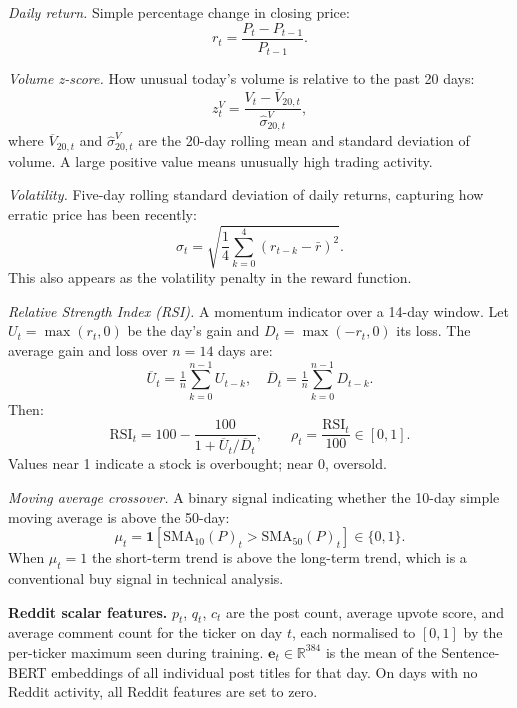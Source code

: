 \documentclass[letterpaper,twocolumn]{article}
\begin{document}
\noindent\textit{Daily return.}
Simple percentage change in closing price:
\begin{equation}
  r_t = \frac{P_t - P_{t-1}}{P_{t-1}}.
\end{equation}

\noindent\textit{Volume z-score.}
How unusual today's volume is relative to the past 20 days:
\begin{equation}
  z^V_t = \frac{V_t - \overline{V}_{20,t}}{\hat{\sigma}^V_{20,t}},
\end{equation}
where $\overline{V}_{20,t}$ and $\hat{\sigma}^V_{20,t}$ are
the 20-day rolling mean and standard deviation of volume.
A large positive value means unusually high trading activity.

\noindent\textit{Volatility.}
Five-day rolling standard deviation of daily returns,
capturing how erratic price has been recently:
\begin{equation}
  \sigma_t = \sqrt{\frac{1}{4}\sum_{k=0}^{4}(r_{t-k} - \bar{r})^2}.
\end{equation}
This also appears as the volatility penalty in the reward
function.

\noindent\textit{Relative Strength Index (RSI).}
A momentum indicator over a 14-day window.
Let $U_t = \max(r_t,0)$ be the day's gain and
$D_t = \max(-r_t,0)$ its loss.
The average gain and loss over $n=14$ days are:
\begin{equation}
  \overline{U}_t = \tfrac{1}{n}\textstyle\sum_{k=0}^{n-1}U_{t-k},
  \quad
  \overline{D}_t = \tfrac{1}{n}\textstyle\sum_{k=0}^{n-1}D_{t-k}.
\end{equation}
Then:
\begin{equation}
  \text{RSI}_t = 100 - \frac{100}{1 + \overline{U}_t/\overline{D}_t},
  \qquad
  \rho_t = \frac{\text{RSI}_t}{100} \in [0,1].
\end{equation}
Values near 1 indicate a stock is overbought; near 0, oversold.

\noindent\textit{Moving average crossover.}
A binary signal indicating whether the 10-day simple moving
average is above the 50-day:
\begin{equation}
  \mu_t = \mathbf{1}\!\left[
    \text{SMA}_{10}(P)_t > \text{SMA}_{50}(P)_t
  \right] \in \{0,1\}.
\end{equation}
When $\mu_t = 1$ the short-term trend is above the long-term
trend, which is a conventional buy signal in technical
analysis.

\smallskip
\noindent\textbf{Reddit scalar features.}
$p_t$, $q_t$, $c_t$ are the post count, average upvote score,
and average comment count for the ticker on day $t$, each
normalised to $[0,1]$ by the per-ticker maximum seen during
training.
$\mathbf{e}_t \in \mathbb{R}^{384}$ is the mean of the
Sentence-BERT embeddings of all individual post titles for
that day.
On days with no Reddit activity, all Reddit features are
set to zero.
\end{document}
